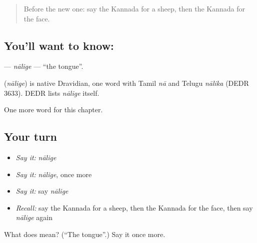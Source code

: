 \begin{quote}
Before the new one: say the Kannada for a sheep, then the Kannada for the face.
\end{quote}

\subsection*{You'll want to know: }
\textbf{} — \emph{nālige} — \textquotedblleft{}the tongue\textquotedblright{}.

\begin{cousinweb}
\textbf{} (\emph{nālige}) is native Dravidian, one word with Tamil \emph{nā} and Telugu \emph{nālika} (DEDR 3633). DEDR lists \emph{nālige} itself.
\end{cousinweb}

\begin{grammarlens}[title={What you've built}]
One more word for this chapter.
\end{grammarlens}

\subsection*{Your turn}
\begin{itemize}
\raggedright
  \item \emph{Say it:} \emph{nālige}
  \item \emph{Say it:} \emph{nālige}, once more
  \item \emph{Say it:} say \emph{nālige}
  \item \emph{Recall:} say the Kannada for a sheep, then the Kannada for the face, then say \emph{nālige} again
\end{itemize}

\begin{tcolorbox}[breakable,colback=teal!4,colframe=teal!35!black,title={Before you move on}]
What does  mean? (\textquotedblleft{}The tongue\textquotedblright{}.) Say it once more.
\end{tcolorbox}

